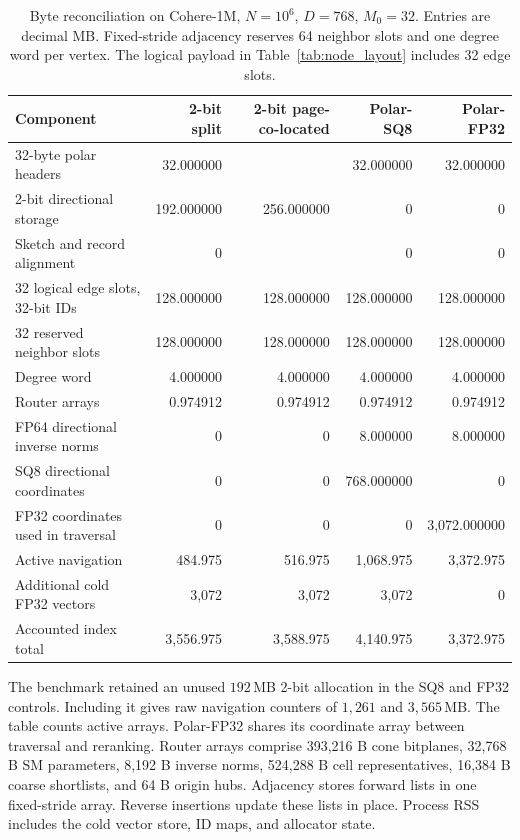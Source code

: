 \begin{table}[t]
 \centering
 \caption{Byte reconciliation on {Cohere-1M}, $N=10^6$, $D=768$, $M_0=32$. Entries are decimal MB. Fixed-stride adjacency reserves 64 neighbor slots and one degree word per vertex. The logical payload in Table~\ref{tab:node_layout} includes 32 edge slots.}
 \label{tab:memory_audit}
 \small
 \begin{tabular}{@{}lrrrr@{}}
 \toprule
 Component & 2-bit split & 2-bit page-co-located & Polar-SQ8 & Polar-FP32\\
 \midrule
 32-byte polar headers & 32.000000 & \multirow{3}{*}{256.000000} & 32.000000 & 32.000000\\
 2-bit directional storage & 192.000000 & & 0 & 0\\
 Sketch and record alignment & 0 & & 0 & 0\\
 32 logical edge slots, 32-bit IDs & 128.000000 & 128.000000 & 128.000000 & 128.000000\\
 32 reserved neighbor slots & 128.000000 & 128.000000 & 128.000000 & 128.000000\\
 Degree word & 4.000000 & 4.000000 & 4.000000 & 4.000000\\
 Router arrays & 0.974912 & 0.974912 & 0.974912 & 0.974912\\
 FP64 directional inverse norms & 0 & 0 & 8.000000 & 8.000000\\
 SQ8 directional coordinates & 0 & 0 & 768.000000 & 0\\
 FP32 coordinates used in traversal & 0 & 0 & 0 & 3,072.000000\\
 \midrule
 Active navigation & 484.975 & 516.975 & 1,068.975 & 3,372.975\\
 Additional cold FP32 vectors & 3,072 & 3,072 & 3,072 & 0\\
 Accounted index total & 3,556.975 & 3,588.975 & 4,140.975 & 3,372.975\\
 \bottomrule
 \end{tabular}
 \par\vspace{2pt}
 {\footnotesize The benchmark retained an unused $192$\,MB 2-bit allocation in the SQ8 and FP32 controls. Including it gives raw navigation counters of $1{,}261$ and $3{,}565$\,MB. The table counts active arrays. Polar-FP32 shares its coordinate array between traversal and reranking. Router arrays comprise 393,216 B cone bitplanes, 32,768 B SM parameters, 8,192 B inverse norms, 524,288 B cell representatives, 16,384 B coarse shortlists, and 64 B origin hubs. Adjacency stores forward lists in one fixed-stride array. Reverse insertions update these lists in place. Process RSS includes the cold vector store, ID maps, and allocator state.}
\end{table}


